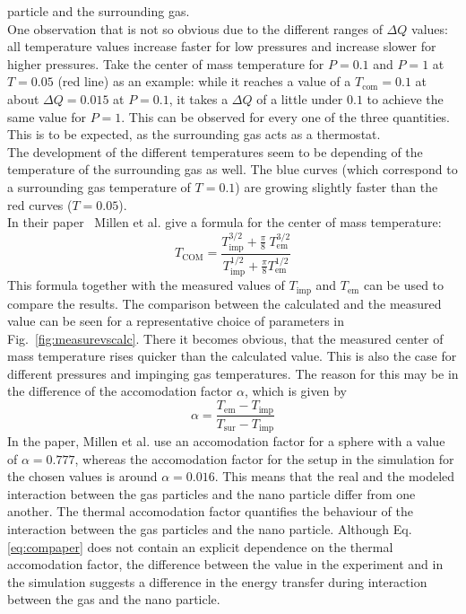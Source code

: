 \documentclass[12pt]{article}
\begin{document}
particle and the surrounding gas.\\
One observation that is not so obvious due to the different ranges of $\Delta Q$ values: all temperature values increase faster for low pressures and
increase slower for higher pressures. Take the center of mass temperature for $P=0.1$ and $P=1$ at $T=0.05$ (red line) as an example: while it reaches
a value of a $T_\text{com} = 0.1$ at about $\Delta Q = 0.015$ at $P=0.1$, it takes a $\Delta Q$ of a little under $0.1$ to achieve the same value
for $P = 1$.
This can be observed for every one of the three quantities. This is to be expected, as the surrounding gas acts as a thermostat. \\
The development of the different temperatures seem to be depending of the temperature of the surrounding gas as well. The blue curves (which
correspond to a surrounding gas temperature of $T=0.1$) are growing slightly faster than the red curves ($T=0.05$).\\
In their paper~\cite{MillenJ.2014} Millen et al. give a formula for the center of mass temperature:
\begin{equation}
    \label{eq:compaper}
    T_\text{COM} = \frac{T_\text{imp}^{3/2}+\tfrac\pi 8 \ T_\text{em}^{3/2}}{T_\text{imp}^{1/2}+\tfrac\pi8 T_\text{em}^{1/2}}
\end{equation}
This formula together with the measured values of $T_\text{imp}$ and $T_\text{em}$ can be used to compare the results. The comparison between the
calculated and the measured value can be seen for a representative choice of parameters in Fig.~\ref{fig:measurevscalc}. There it becomes obvious,
that the measured center of mass temperature rises quicker than the calculated value. This is also the case for different pressures and impinging gas
temperatures. The reason for this may be in the difference of the accomodation factor $\alpha$, which is given by~\cite{Goodman1980}
\begin{equation}
    \alpha = \frac{T_\text{em} - T_\text{imp}}{T_\text{sur} - T_\text{imp}}
\end{equation}
In the paper, Millen et al. use an accomodation factor
for a sphere with a value of $\alpha = 0.777$, whereas the accomodation factor for the setup in the simulation for the chosen values is around
$\alpha = 0.016$. This means that the real and the modeled interaction between the gas particles and the nano particle differ from one another.
The thermal accomodation factor quantifies the behaviour of the interaction between the gas particles and the nano particle. Although Eq.
\eqref{eq:compaper} does not contain an explicit dependence on the thermal accomodation factor, the difference between the value in the experiment and
in the simulation suggests a difference in the energy transfer during interaction between the gas and the nano particle.
\end{document}
